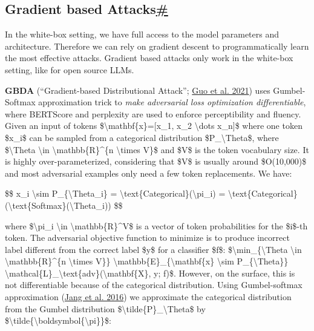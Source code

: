 \subsection{\texorpdfstring{Gradient based Attacks\hyperref[gradient-based-attacks]{\#}}{Gradient based Attacks\#}}\label{gradient-based-attacks}

In the white-box setting, we have full access to the model parameters and architecture. Therefore we can rely on gradient descent to programmatically learn the most effective attacks. Gradient based attacks only work in the white-box setting, like for open source LLMs.

\textbf{GBDA} (``Gradient-based Distributional Attack''; \href{https://arxiv.org/abs/2104.13733}{Guo et al. 2021}) uses Gumbel-Softmax approximation trick to \emph{make adversarial loss optimization differentiable}, where BERTScore and perplexity are used to enforce perceptibility and fluency. Given an input of tokens \$\textbackslash mathbf\{x\}={[}x\_1, x\_2 \textbackslash dots x\_n{]}\$ where one token \$x\_i\$ can be sampled from a categorical distribution \$P\_\textbackslash Theta\$, where \$\textbackslash Theta \textbackslash in \textbackslash mathbb\{R\}\^{}\{n \textbackslash times V\}\$ and \$V\$ is the token vocabulary size. It is highly over-parameterized, considering that \$V\$ is usually around \$O(10,000)\$ and most adversarial examples only need a few token replacements. We have:

\$\$ x\_i \textbackslash sim P\_\{\textbackslash Theta\_i\} = \textbackslash text\{Categorical\}(\textbackslash pi\_i) = \textbackslash text\{Categorical\}(\textbackslash text\{Softmax\}(\textbackslash Theta\_i)) \$\$

where \$\textbackslash pi\_i \textbackslash in \textbackslash mathbb\{R\}\^{}V\$ is a vector of token probabilities for the \$i\$-th token. The adversarial objective function to minimize is to produce incorrect label different from the correct label \$y\$ for a classifier \$f\$: \$\textbackslash min\_\{\textbackslash Theta \textbackslash in \textbackslash mathbb\{R\}\^{}\{n \textbackslash times V\}\} \textbackslash mathbb\{E\}\_\{\textbackslash mathbf\{x\} \textbackslash sim P\_\{\textbackslash Theta\}\} \textbackslash mathcal\{L\}\_\textbackslash text\{adv\}(\textbackslash mathbf\{X\}, y; f)\$. However, on the surface, this is not differentiable because of the categorical distribution. Using Gumbel-softmax approximation (\href{https://arxiv.org/abs/1611.01144}{Jang et al. 2016}) we approximate the categorical distribution from the Gumbel distribution \$\textbackslash tilde\{P\}\_\textbackslash Theta\$ by \$\textbackslash tilde\{\textbackslash boldsymbol\{\textbackslash pi\}\}\$:

